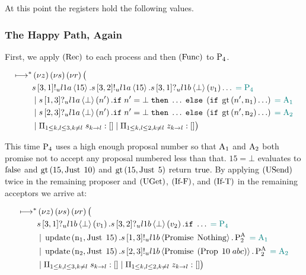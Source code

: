 At this point the registers hold the following values.


\subsubsection{The Happy Path, Again}

First, we apply $\RRec$ to each process and then $\RSideEffect$ to $\Proposer{4}$.

\begin{align*}
\mapstostar& \NuChannels \big (\\
&
    \SendUnreliableP{\ChannelS}{3}{1}{\LOneA}{15}.
    \SendUnreliableP{\ChannelS}{3}{2}{\LOneA}{15}.
    \ReceiveUnreliableP{\ChannelS}{3}{1}{\LOneB}{\bot}{v_1}\ldots
    \comment{= \Proposer{4}}\\
&\Or
    \ReceiveUnreliableP{\ChannelS}{1}{3}{\LOneA}{\bot}{n'}.
    \mIf n' = \bot
    \;\mThen \ldots
    \;\mElse \Paren{
            \mIf \greaterThan{n'}{\NumberRegister_1}
            \ldots
        }
    \comment{= \Acceptor{1}}\\
&\Or
    \ReceiveUnreliableP{\ChannelS}{2}{3}{\LOneA}{\bot}{n'}.
    \mIf n' = \bot
    \;\mThen \ldots
    \;\mElse \Paren{
        \mIf \greaterThan{n'}{\NumberRegister_2}
        \ldots
    }
    \comment{= \Acceptor{2}}\\
&\Or \InnerSessionQueues{\ChannelS}
\Or \OuterSessionQueues
\big )
\end{align*}

This time $\Proposer{4}$ uses a high enough proposal number so that $\Acceptor{1}$ and $\Acceptor{2}$ both promise not to accept any proposal numbered less than that.
$15 = \bot$ evaluates to $\False$ and $\greaterThan{15}{\Just{10}}$ and $\greaterThan{15}{\Just{5}}$ return $\True$.
By applying $\RUsend$ twice in the remaining proposer and $\RUget$, $\RIfF$, and $\RIfT$ in the remaining acceptors we arrive at:

\begin{align*}
\mapstostar& \NuChannels \big (\\
&
    \ReceiveUnreliableP{\ChannelS}{3}{1}{\LOneB}{\bot}{v_1}.
    \ReceiveUnreliableP{\ChannelS}{3}{2}{\LOneB}{\bot}{v_2}.
    \mIf \ldots
    \comment{= \Proposer{4}}\\
&\Or
    \update{\NumberRegister_1}{\Just{15}}.
    \SendUnreliableP{\ChannelS}{1}{3}{\LOneB}{\Promise{\Nothing}}.
    \PaTwo
    \comment{= \Acceptor{1}}\\
&\Or
    \update{\NumberRegister_2}{\Just{15}}.
    \SendUnreliableP{\ChannelS}{2}{3}{\LOneB}{\Promise{\Paren{\ProposalC{10}{abc}}}}.
    \PaTwo \comment{= \Acceptor{2}}\\
&\Or \InnerSessionQueues{\ChannelS}
\Or \OuterSessionQueues
\big )
\end{align*}


